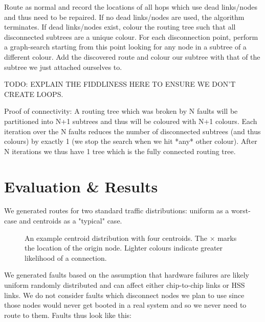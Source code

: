 			Route as normal and record the locations of all hops which use dead
			links/nodes and thus need to be repaired. If no dead links/nodes are
			used, the algorithm terminates. If dead links/nodes exist, colour the
			routing tree such that all disconnected subtrees are a unique colour. For
			each disconnection point, perform a graph-search starting from this point
			looking for any node in a subtree of a different colour. Add the
			discovered route and colour our subtree with that of the subtree we just
			attached ourselves to.
			
			TODO: EXPLAIN THE FIDDLINESS HERE TO ENSURE WE DON'T CREATE LOOPS. 
			
			Proof of connectivity: A routing tree which was broken by N faults will
			be partitioned into N+1 subtrees and thus will be coloured with N+1
			colours. Each iteration over the N faults reduces the number of
			disconnected subtrees (and thus colours) by exactly 1 (we stop the search
			when we hit *any* other colour). After N iterations we thus have 1 tree
			which is the fully connected routing tree.
		
	\section{Evaluation \& Results}
		
		We generated routes for two standard traffic distributions: uniform as a
		worst-case and centroids as a "typical" case.
		
		\begin{figure}
			\center
			
			\caption{An example centroid distribution with four centroids. The
			$\times$ marks the location of the origin node. Lighter colours indicate
			greater likelihood of a connection.}
			\label{fig:traffic-distribution-centroids}
		\end{figure}
		
		We generated faults based on the assumption that hardware failures are
		likely uniform randomly distributed and can affect either chip-to-chip
		links or HSS links. We do not consider faults which disconnect nodes we
		plan to use since those nodes would never get booted in a real system and
		so we never need to route to them. Faults thus look like this:
		
